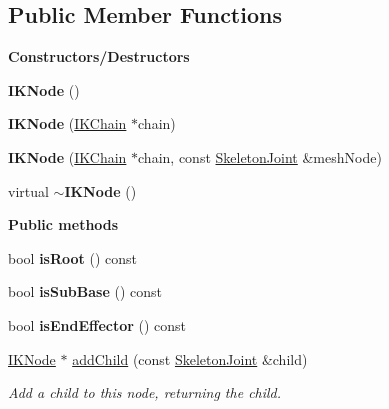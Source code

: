 \subsection*{Public Member Functions}
\begin{Indent}\textbf{ Constructors/\+Destructors}\par
\begin{DoxyCompactItemize}
\item 
\mbox{\label{classrev_1_1_i_k_node_aa0b117b0f27696e2a7c6dd25913df1d1}} 
{\bfseries I\+K\+Node} ()
\item 
\mbox{\label{classrev_1_1_i_k_node_a69dcb2be6557c668ea1cf85c368fe544}} 
{\bfseries I\+K\+Node} (\mbox{\hyperlink{classrev_1_1_i_k_chain}{I\+K\+Chain}} $\ast$chain)
\item 
\mbox{\label{classrev_1_1_i_k_node_a6c0c60377160e8a17e08ea6d8059c274}} 
{\bfseries I\+K\+Node} (\mbox{\hyperlink{classrev_1_1_i_k_chain}{I\+K\+Chain}} $\ast$chain, const \mbox{\hyperlink{classrev_1_1_skeleton_joint}{Skeleton\+Joint}} \&mesh\+Node)
\item 
\mbox{\label{classrev_1_1_i_k_node_ab41db4d42b219bb8effcdcc6ec5d221d}} 
virtual {\bfseries $\sim$\+I\+K\+Node} ()
\end{DoxyCompactItemize}
\end{Indent}
\begin{Indent}\textbf{ Public methods}\par
\begin{DoxyCompactItemize}
\item 
\mbox{\label{classrev_1_1_i_k_node_a37bd15e2a39b3c69e6476b180f9a950d}} 
bool {\bfseries is\+Root} () const
\item 
\mbox{\label{classrev_1_1_i_k_node_a9dc4dca22b9711cdfb54cea4589c0dfc}} 
bool {\bfseries is\+Sub\+Base} () const
\item 
\mbox{\label{classrev_1_1_i_k_node_a66cf5dfbb63852d6ca29a52ba4fb3190}} 
bool {\bfseries is\+End\+Effector} () const
\item 
\mbox{\label{classrev_1_1_i_k_node_a69e4665f930376282d251cc59a7643fb}} 
\mbox{\hyperlink{classrev_1_1_i_k_node}{I\+K\+Node}} $\ast$ \mbox{\hyperlink{classrev_1_1_i_k_node_a69e4665f930376282d251cc59a7643fb}{add\+Child}} (const \mbox{\hyperlink{classrev_1_1_skeleton_joint}{Skeleton\+Joint}} \&child)
\begin{DoxyCompactList}\small\item\em Add a child to this node, returning the child. \end{DoxyCompactList}\end{DoxyCompactItemize}
\end{Indent}
